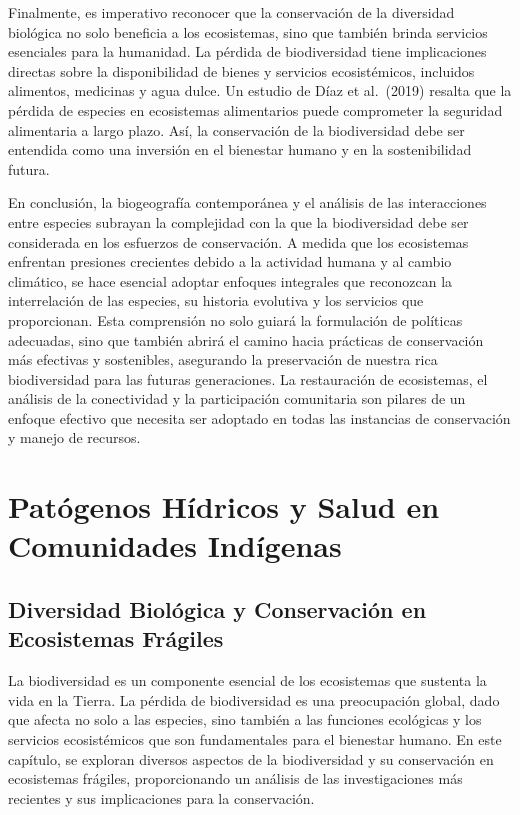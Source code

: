 \documentclass[
  letterpaper,
  DIV=11,
  numbers=noendperiod,
  oneside]{scrreprt}
\begin{document}
Finalmente, es imperativo reconocer que la conservación de la diversidad
biológica no solo beneficia a los ecosistemas, sino que también brinda
servicios esenciales para la humanidad. La pérdida de biodiversidad
tiene implicaciones directas sobre la disponibilidad de bienes y
servicios ecosistémicos, incluidos alimentos, medicinas y agua dulce. Un
estudio de Díaz et al.~(2019) resalta que la pérdida de especies en
ecosistemas alimentarios puede comprometer la seguridad alimentaria a
largo plazo. Así, la conservación de la biodiversidad debe ser entendida
como una inversión en el bienestar humano y en la sostenibilidad futura.

En conclusión, la biogeografía contemporánea y el análisis de las
interacciones entre especies subrayan la complejidad con la que la
biodiversidad debe ser considerada en los esfuerzos de conservación. A
medida que los ecosistemas enfrentan presiones crecientes debido a la
actividad humana y al cambio climático, se hace esencial adoptar
enfoques integrales que reconozcan la interrelación de las especies, su
historia evolutiva y los servicios que proporcionan. Esta comprensión no
solo guiará la formulación de políticas adecuadas, sino que también
abrirá el camino hacia prácticas de conservación más efectivas y
sostenibles, asegurando la preservación de nuestra rica biodiversidad
para las futuras generaciones. La restauración de ecosistemas, el
análisis de la conectividad y la participación comunitaria son pilares
de un enfoque efectivo que necesita ser adoptado en todas las instancias
de conservación y manejo de recursos.

\chapter{Patógenos Hídricos y Salud en Comunidades
Indígenas}\label{patuxf3genos-huxeddricos-y-salud-en-comunidades-induxedgenas}

\section{Diversidad Biológica y Conservación en Ecosistemas
Frágiles}\label{diversidad-bioluxf3gica-y-conservaciuxf3n-en-ecosistemas-fruxe1giles}

La biodiversidad es un componente esencial de los ecosistemas que
sustenta la vida en la Tierra. La pérdida de biodiversidad es una
preocupación global, dado que afecta no solo a las especies, sino
también a las funciones ecológicas y los servicios ecosistémicos que son
fundamentales para el bienestar humano. En este capítulo, se exploran
diversos aspectos de la biodiversidad y su conservación en ecosistemas
frágiles, proporcionando un análisis de las investigaciones más
recientes y sus implicaciones para la conservación.
\end{document}
